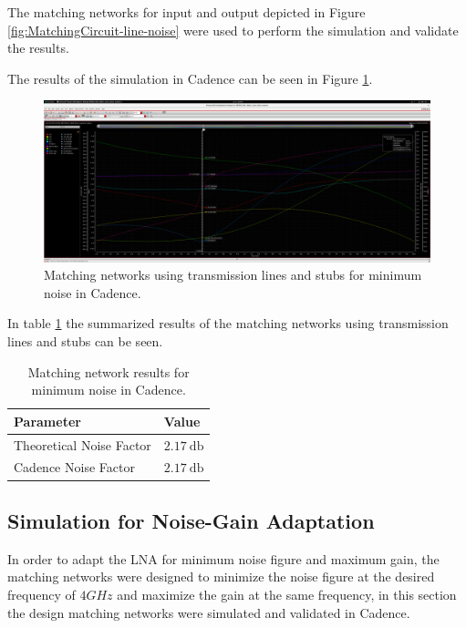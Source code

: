 The matching networks for input and output depicted in Figure \ref{fig:MatchingCircuit-line-noise} were used to perform the simulation and validate the results.

The results of the simulation in Cadence can be seen in Figure \ref{fig:CadenceNoiseMatchingCircuitLine}.
\begin{figure}[H]
    \centering
    \includegraphics[width=1\textwidth]{Images/CAD-LinesmatchNoise.png}
    \caption{Matching networks using transmission lines and stubs for minimum noise in Cadence.}
    \label{fig:CadenceNoiseMatchingCircuitLine}
\end{figure}

In table \ref{tab:NoiseMatchingParameters} the summarized results of the matching networks using transmission lines and stubs can be seen.
\begin{table}[H]
    \centering
    \caption{Matching network results for minimum noise in Cadence.}
    \begin{tabularx}{\textwidth}{>{\centering\arraybackslash}X >{\centering\arraybackslash}X}
        \toprule
        \textbf{Parameter} & \textbf{Value} \\
        \midrule
        Theoretical Noise Factor  & $\SI{2.17}{\decibel}$ \\
        \midrule
        Cadence Noise Factor & $\SI{2.17}{\decibel}$ \\
        \bottomrule
    \end{tabularx}
    \label{tab:NoiseMatchingParameters}
\end{table}

\subsection{Simulation for Noise-Gain Adaptation}

In order to adapt the LNA for minimum noise figure and maximum gain, the matching networks were designed to minimize the noise figure at the desired frequency of $4 GHz$ and maximize the gain at the same frequency, in this section the design matching networks were simulated and validated in Cadence.

